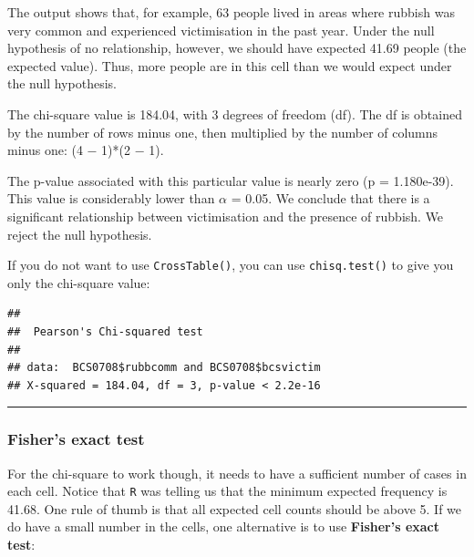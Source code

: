 \documentclass[
]{book}
\newenvironment{Shaded}{\begin{snugshade}}{\end{snugshade}}
\newcommand{\FunctionTok}[1]{\textcolor[rgb]{0.00,0.00,0.00}{#1}}
\newcommand{\NormalTok}[1]{#1}
\newcommand{\SpecialCharTok}[1]{\textcolor[rgb]{0.00,0.00,0.00}{#1}}
\begin{document}
The output shows that, for example, 63 people lived in areas where rubbish was very common and experienced victimisation in the past year. Under the null hypothesis of no relationship, however, we should have expected 41.69 people (the expected value). Thus, more people are in this cell than we would expect under the null hypothesis.

The chi-square value is 184.04, with 3 degrees of freedom (df). The df is obtained by the number of rows minus one, then multiplied by the number of columns minus one: (4 − 1)*(2 − 1).

The p-value associated with this particular value is nearly zero (p = 1.180e-39). This value is considerably lower than \(\alpha\) = 0.05. We conclude that there is a significant relationship between victimisation and the presence of rubbish. We reject the null hypothesis.

If you do not want to use \texttt{CrossTable()}, you can use \texttt{chisq.test()} to give you only the chi-square value:

\begin{Shaded}
\end{Shaded}

\begin{verbatim}
## 
##  Pearson's Chi-squared test
## 
## data:  BCS0708$rubbcomm and BCS0708$bcsvictim
## X-squared = 184.04, df = 3, p-value < 2.2e-16
\end{verbatim}

\begin{center}\rule{0.5\linewidth}{0.5pt}\end{center}

\hypertarget{fishers-exact-test}{%
\subsubsection{Fisher's exact test}\label{fishers-exact-test}}

For the chi-square to work though, it needs to have a sufficient number of cases in each cell. Notice that \texttt{R} was telling us that the minimum expected frequency is 41.68. One rule of thumb is that all expected cell counts should be above 5. If we do have a small number in the cells, one alternative is to use \textbf{Fisher's exact test}:
\end{document}
